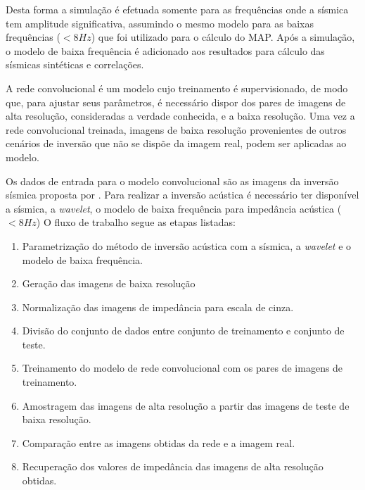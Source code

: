 Desta forma a simulação é
efetuada somente para as frequências onde a sísmica tem amplitude significativa,
assumindo o mesmo modelo para as baixas frequências ($<8Hz$) que foi utilizado
para o cálculo do MAP. Após a simulação, o modelo de baixa frequência é
adicionado aos resultados para cálculo das sísmicas sintéticas e correlações.

A rede convolucional é um modelo cujo treinamento é supervisionado, de modo que,
para ajustar seus parâmetros, é necessário dispor dos pares de imagens de alta
resolução, consideradas a verdade conhecida, e a baixa resolução. Uma vez a
rede convolucional treinada, imagens de baixa resolução provenientes de outros cenários de inversão
que não se dispõe da imagem real, podem ser aplicadas ao modelo.

Os dados de entrada para o modelo convolucional são as imagens da inversão sísmica
proposta por \cite{}. Para realizar a inversão acústica é necessário
ter disponível a sísmica, a \textit{wavelet}, o modelo de baixa frequência para
impedância acústica ($<8Hz$) %
O fluxo de trabalho segue as etapas listadas:
 
\begin{enumerate}
  \item Parametrização do método de inversão acústica com a sísmica, a \textit{wavelet} e o modelo de baixa frequência.
  \item Geração das imagens de baixa resolução
  \item Normalização das imagens de impedância para escala de cinza.
  \item Divisão do conjunto de dados entre conjunto de treinamento e conjunto de teste.
  \item Treinamento do modelo de rede convolucional com os pares de imagens de treinamento.
  \item Amostragem das imagens de alta resolução a partir das imagens de teste de baixa resolução.
  \item Comparação entre as imagens obtidas da rede e a imagem real.
  \item Recuperação dos valores de impedância das imagens de alta resolução obtidas.
\end{enumerate}

